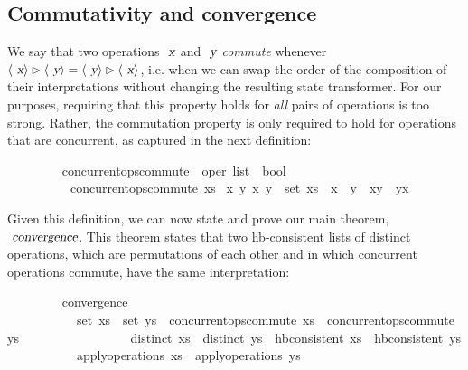 \subsection{Commutativity and convergence}\label{sect.ops.commute}

We say that two operations $\isa{x}$ and $\isa{y}$ \emph{commute} whenever $\langle\isa{x}\rangle \mathbin{\isasymrhd} \langle\isa{y}\rangle = \langle\isa{y}\rangle \mathbin{\isasymrhd} \langle\isa{x}\rangle$, i.e. when we can swap the order of the composition of their interpretations without changing the resulting state transformer.
For our purposes, requiring that this property holds for \emph{all} pairs of operations is too strong.
Rather, the commutation property is only required to hold for operations that are concurrent, as captured in the next definition:
\vspace{0.25em}
\begin{isabellebody}
\ \ \ \ \ \ \ \  concurrent{\isacharunderscore}ops{\isacharunderscore}commute\ {\isacharcolon}{\isacharcolon}\ {\isachardoublequoteopen}{\isacharprime}oper\ list\ {\isasymRightarrow}\ bool{\isachardoublequoteclose}\ \isanewline
\ \ \ \ \ \ \ \ \ \ {\isachardoublequoteopen}concurrent{\isacharunderscore}ops{\isacharunderscore}commute\ xs\ {\isasymequiv} {\isasymforall}x\ y{\isachardot}\ {\isacharbraceleft}x{\isacharcomma}\ y{\isacharbraceright}\ {\isasymsubseteq}\ set\ xs\ {\isasymlongrightarrow}\ x\ {\isasymparallel}\ y\ {\isasymlongrightarrow}\ {\isasymlangle}x{\isasymrangle}{\isasymrhd}{\isasymlangle}y{\isasymrangle}\ {\isacharequal}\ {\isasymlangle}y{\isasymrangle}{\isasymrhd}{\isasymlangle}x{\isasymrangle}{\isachardoublequoteclose}
\end{isabellebody}
\vspace{0.25em}
Given this definition, we can now state and prove our main theorem, $\isa{convergence}$.
This theorem states that two hb-consistent lists of distinct operations, which are permutations of each other and in which concurrent operations commute, have the same interpretation:
\vspace{0.25em}
\begin{isabellebody}
\ \ \ \ \ \ \ \  convergence{\isacharcolon}\isanewline
\ \ \ \ \ \ \ \ \ \ \ {\isachardoublequoteopen}set\ xs\ {\isacharequal}\ set\ ys{\isachardoublequoteclose}\ \ {\isachardoublequoteopen}concurrent{\isacharunderscore}ops{\isacharunderscore}commute\ xs{\isachardoublequoteclose}\ \ {\isachardoublequoteopen}concurrent{\isacharunderscore}ops{\isacharunderscore}commute\ ys{\isachardoublequoteclose}\isanewline
\ \ \ \ \ \ \ \ \ \ \ \ \ \ \ \ \ {\isachardoublequoteopen}distinct\ xs{\isachardoublequoteclose}\ \ {\isachardoublequoteopen}distinct\ ys{\isachardoublequoteclose}\ \ {\isachardoublequoteopen}hb{\isacharunderscore}consistent\ xs{\isachardoublequoteclose}\ \ {\isachardoublequoteopen}hb{\isacharunderscore}consistent\ ys{\isachardoublequoteclose}\isanewline
\ \ \ \ \ \ \ \ \ \ \ {\isachardoublequoteopen}apply{\isacharunderscore}operations\ xs\ {\isacharequal}\ apply{\isacharunderscore}operations\ ys{\isachardoublequoteclose}
\end{isabellebody}
